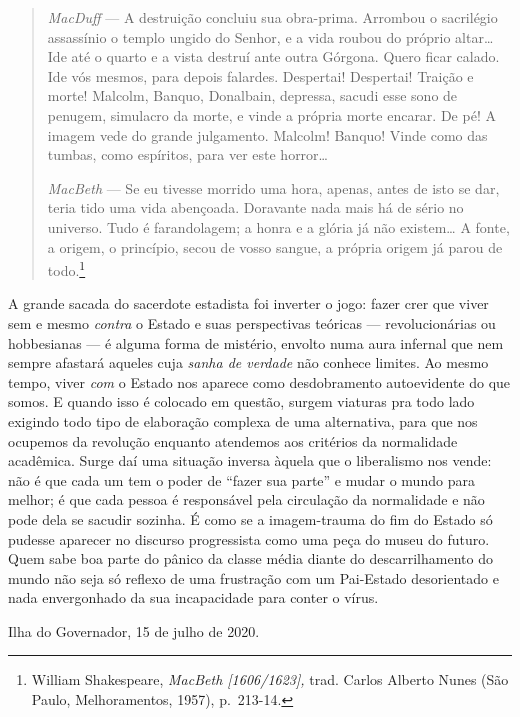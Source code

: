 \begin{quote}
\textit{MacDuff} --- A destruição concluiu sua obra-prima. Arrombou o
sacrilégio assassínio o templo ungido do Senhor, e a vida roubou do
próprio altar\ldots{} Ide até o quarto e a vista destruí ante outra
Górgona. Quero ficar calado. Ide vós mesmos, para depois falardes.
Despertai! Despertai! Traição e morte! Malcolm, Banquo, Donalbain,
depressa, sacudi esse sono de penugem, simulacro da morte, e vinde a
própria morte encarar. De pé! A imagem vede do grande julgamento.
Malcolm! Banquo! Vinde como das tumbas, como espíritos, para ver este
horror\dots{}~

\textit{MacBeth} --- Se eu tivesse morrido uma hora, apenas, antes de isto
se dar, teria tido uma vida abençoada. Doravante nada mais há de sério
no universo. Tudo é farandolagem; a honra e a glória já não existem\dots{} A
fonte, a origem, o princípio, secou de vosso sangue, a própria origem já
parou de todo.\footnote{William Shakespeare, \textit{MacBeth
  {[}1606/1623{]},} trad. Carlos Alberto Nunes (São Paulo,
  Melhoramentos, 1957), p.~213-14.}
\end{quote}

A grande sacada do sacerdote estadista foi inverter o jogo: fazer crer
que viver sem e mesmo \textit{contra} o Estado e suas perspectivas
teóricas --- revolucionárias ou hobbesianas --- é alguma forma de
mistério, envolto numa aura infernal que nem sempre afastará aqueles
cuja \textit{sanha de verdade} não conhece limites. Ao mesmo tempo, viver
\textit{com} o Estado nos aparece como desdobramento autoevidente do que
somos. E quando isso é colocado em questão, surgem viaturas pra todo
lado exigindo todo tipo de elaboração complexa de uma alternativa, para
que nos ocupemos da revolução enquanto atendemos aos critérios da
normalidade acadêmica. Surge daí uma situação inversa àquela que o
liberalismo nos vende: não é que cada um tem o poder de ``fazer sua
parte'' e mudar o mundo para melhor; é que cada pessoa é responsável
pela circulação da normalidade e não pode dela se sacudir sozinha. É
como se a imagem-trauma do fim do Estado só pudesse aparecer no discurso
progressista como uma peça do museu do futuro. Quem sabe boa parte do
pânico da classe média diante do descarrilhamento do mundo não seja só
reflexo de uma frustração com um Pai-Estado desorientado e nada
envergonhado da sua incapacidade para conter o vírus.

\begin{flushright}
Ilha do Governador, 15 de julho de 2020.
\end{flushright}


